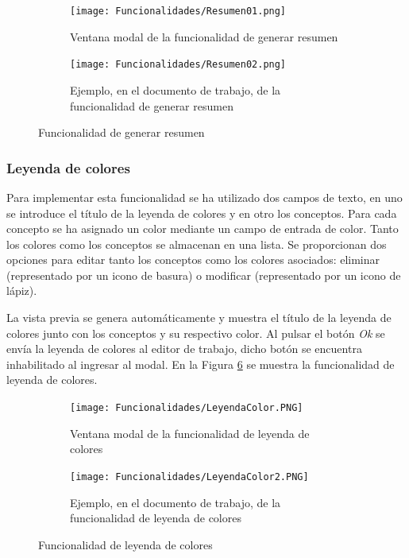 \begin{figure}[ht!]
  \centering
  \begin{subfigure}{\textwidth}
    \centering
    \texttt{[image: Funcionalidades/Resumen01.png]}
    \caption{Ventana modal de la funcionalidad de generar resumen}
    \label{fig:impresumen01}
  \end{subfigure}

  \begin{subfigure}{\textwidth}
    \centering
    \texttt{[image: Funcionalidades/Resumen02.png]}
    \caption{Ejemplo, en el documento de trabajo, de la funcionalidad de generar resumen}
    \label{fig:impresumen02}
  \end{subfigure}

  \caption{Funcionalidad de generar resumen}
  \label{fig:impresumen}
\end{figure}

\subsubsection{Leyenda de colores}
\label{sec:leyendaColores}
Para implementar esta funcionalidad se ha utilizado dos campos de texto, en uno se introduce el título de la leyenda de colores y en otro los conceptos. Para cada concepto se ha asignado un color mediante un campo de entrada de color. Tanto los colores como los conceptos se almacenan en una lista. Se proporcionan dos opciones para editar tanto los conceptos como los colores asociados: eliminar (representado por un icono de basura) o modificar (representado por un icono de lápiz).

La vista previa se genera automáticamente y muestra el título de la leyenda de colores junto con los conceptos y su respectivo color. Al pulsar el botón \textit{Ok} se envía la leyenda de colores al editor de trabajo, dicho botón se encuentra inhabilitado al ingresar al modal. En la Figura \ref{fig:leyendacolor} se muestra la funcionalidad de leyenda de colores.

\begin{figure}[ht!]
  \centering
  \begin{subfigure}{\textwidth}
    \centering
    \texttt{[image: Funcionalidades/LeyendaColor.PNG]}
    \caption{Ventana modal de la funcionalidad de leyenda de colores}
    \label{fig:leyendacolor01}
  \end{subfigure}

  \begin{subfigure}{\textwidth}
    \centering
    \texttt{[image: Funcionalidades/LeyendaColor2.PNG]}
    \caption{Ejemplo, en el documento de trabajo, de la funcionalidad de leyenda de colores}
    \label{fig:leyendacolor02}
  \end{subfigure}

  \caption{Funcionalidad de leyenda de colores}
  \label{fig:leyendacolor}
\end{figure}


